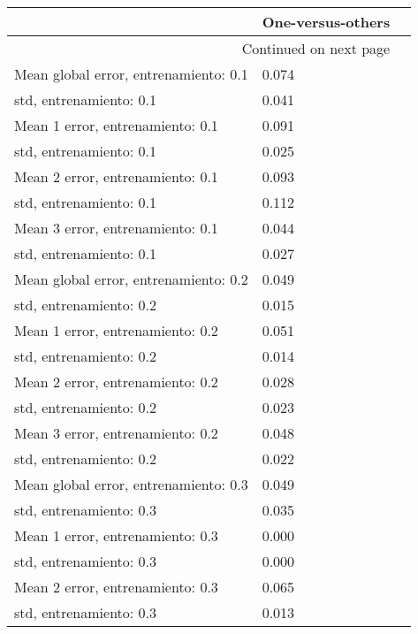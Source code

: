 \begin{longtable}{p{4cm}|p{1.5cm}|p{1.5cm}}
\toprule
{} &  One-versus-others \\
\midrule
\endhead
\midrule
\multicolumn{2}{r}{{Continued on next page}} \\
\midrule
\endfoot

\bottomrule
\endlastfoot
Mean global error, entrenamiento: 0.1 &              0.074 \\
std, entrenamiento: 0.1               &              0.041 \\
Mean 1 error, entrenamiento: 0.1      &              0.091 \\
std, entrenamiento: 0.1               &              0.025 \\
Mean 2 error, entrenamiento: 0.1      &              0.093 \\
std, entrenamiento: 0.1               &              0.112 \\
Mean 3 error, entrenamiento: 0.1      &              0.044 \\
std, entrenamiento: 0.1               &              0.027 \\
Mean global error, entrenamiento: 0.2 &              0.049 \\
std, entrenamiento: 0.2               &              0.015 \\
Mean 1 error, entrenamiento: 0.2      &              0.051 \\
std, entrenamiento: 0.2               &              0.014 \\
Mean 2 error, entrenamiento: 0.2      &              0.028 \\
std, entrenamiento: 0.2               &              0.023 \\
Mean 3 error, entrenamiento: 0.2      &              0.048 \\
std, entrenamiento: 0.2               &              0.022 \\
Mean global error, entrenamiento: 0.3 &              0.049 \\
std, entrenamiento: 0.3               &              0.035 \\
Mean 1 error, entrenamiento: 0.3      &              0.000 \\
std, entrenamiento: 0.3               &              0.000 \\
Mean 2 error, entrenamiento: 0.3      &              0.065 \\
std, entrenamiento: 0.3               &              0.013 \\

\end{longtable}
